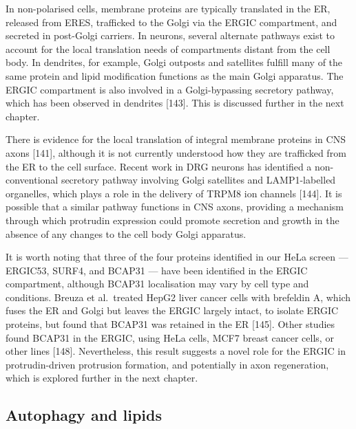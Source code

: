 \documentclass[
  12pt,
  a4paper,
]{book}
\begin{document}
In non-polarised cells, membrane proteins are typically translated in the ER, released from ERES, trafficked to the Golgi via the ERGIC compartment, and secreted in post-Golgi carriers. In neurons, several alternate pathways exist to account for the local translation needs of compartments distant from the cell body. In dendrites, for example, Golgi outposts and satellites fulfill many of the same protein and lipid modification functions as the main Golgi apparatus. The ERGIC compartment is also involved in a Golgi-bypassing secretory pathway, which has been observed in dendrites {[}143{]}. This is discussed further in the next chapter.

There is evidence for the local translation of integral membrane proteins in CNS axons {[}141{]}, although it is not currently understood how they are trafficked from the ER to the cell surface. Recent work in DRG neurons has identified a non-conventional secretory pathway involving Golgi satellites and LAMP1-labelled organelles, which plays a role in the delivery of TRPM8 ion channels {[}144{]}. It is possible that a similar pathway functions in CNS axons, providing a mechanism through which protrudin expression could promote secretion and growth in the absence of any changes to the cell body Golgi apparatus.

It is worth noting that three of the four proteins identified in our HeLa screen --- ERGIC53, SURF4, and BCAP31 --- have been identified in the ERGIC compartment, although BCAP31 localisation may vary by cell type and conditions. Breuza et al.~treated HepG2 liver cancer cells with brefeldin A, which fuses the ER and Golgi but leaves the ERGIC largely intact, to isolate ERGIC proteins, but found that BCAP31 was retained in the ER {[}145{]}. Other studies found BCAP31 in the ERGIC, using HeLa cells, MCF7 breast cancer cells, or other lines {[}148{]}. Nevertheless, this result suggests a novel role for the ERGIC in protrudin-driven protrusion formation, and potentially in axon regeneration, which is explored further in the next chapter.

\subsection{Autophagy and lipids}\label{autophagy-and-lipids}
\end{document}
